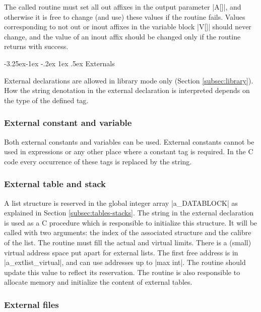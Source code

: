 \documentclass{article}
\makeatletter
\newcommand\g[1]{{\sf #1}}
\renewcommand\subsection{%
\@startsection{subsection}{2}{\z@}%
   {-3.25ex\@plus -1ex \@minus -.2ex}%
   {1ex \@plus .5ex}%
   {\normalfont\normalsize\bfseries}}
\makeatother
\begin{document}
\smallskip
\noindent
The called routine must set all out affixes in the output parameter
\pp|A[]|, and otherwise it is free to change (and use) these values
if the routine fails. Values corresponding to not out or inout affixes
in the variable block \pp|V[]| should never change, and the value 
of an inout affix should be changed only if the routine returns with success.

\subsection{Externals}\label{subsec:externals}

External declarations are allowed in library mode only (Section
\ref{subsec:library}). How the \g{string denotation} in the external declaration
is interpreted depends on the type of the defined tag.

\subsubsection{External constant and variable}

Both external constants and variables can be used. External constants cannot
be used in expressions or any other place where a constant tag is required.
In the {\sf C} code every occurrence of these tags is replaced by the
string.

\subsubsection{External table and stack}

A list structure is reserved in the global integer array \pp|a\_DATABLOCK|
as explained in Section \ref{subsec:tables-stacks}. The string in the
external declaration is used as a {\sf C} procedure which is responsible to
initialize this structure. It will be called with two arguments: the index
of the associated structure and the calibre of the list. The routine must
fill the actual and virtual limits. There is a (small) virtual address 
space put apart
for external lists. The first free address is in 
\pp|a\_extlist\_virtual|, and can use addresses up to \pp|max int|.
The routine should update this value to reflect its reservation. The routine
is also responsible to allocate memory and initialize the content of
external tables.

\subsubsection{External files}
\end{document}
